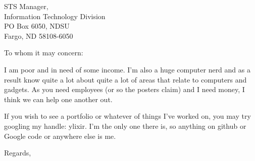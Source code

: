 \documentclass[letterpaper]{letter}
\begin{document}
\begin{letter}{STS Manager,\\Information Technology Division\\PO Box 6050, NDSU\\Fargo, ND 58108-6050}
\opening{To whom it may concern:}
I am poor and in need of some income. I'm also a huge computer nerd and as a result know quite a lot about quite a lot of areas that relate to computers and gadgets. As you need employees (or so the posters claim) and I need money, I think we can help one another out.

If you wish to see a portfolio or whatever of things I've worked on, you may try googling my handle: ylixir. I'm the only one there is, so anything on github or Google code or anywhere else is me.
\closing{Regards,}
\end{letter}
\end{document}
